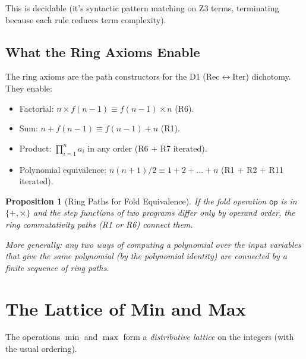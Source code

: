 \documentclass[11pt,a4paper]{report}
\theoremstyle{definition}
\theoremstyle{plain}
\newtheorem{proposition}[definition]{Proposition}
\newcommand{\op}{\mathsf{op}}
\begin{document}
This is decidable (it's syntactic pattern matching on Z3 terms,
terminating because each rule reduces term complexity).

\subsection{What the Ring Axioms Enable}

The ring axioms are the path constructors for the D1
(Rec$\leftrightarrow$Iter) dichotomy.  They enable:

\begin{itemize}
  \item Factorial: $n \times f(n-1) \equiv f(n-1) \times n$ (R6).
  \item Sum: $n + f(n-1) \equiv f(n-1) + n$ (R1).
  \item Product: $\prod_{i=1}^n a_i$ in any order (R6 + R7 iterated).
  \item Polynomial equivalence: $n(n+1)/2 \equiv 1 + 2 + \ldots + n$
    (R1 + R2 + R11 iterated).
\end{itemize}

\begin{proposition}[Ring Paths for Fold Equivalence]
If the fold operation $\op$ is in $\{+, \times\}$ and the step
functions of two programs differ only by operand order, the ring
commutativity paths (R1 or R6) connect them.

More generally: any two ways of computing a polynomial over the
input variables that give the same polynomial (by the polynomial
identity) are connected by a finite sequence of ring paths.
\end{proposition}


\section{The Lattice of Min and Max}

The operations $\min$ and $\max$ form a \emph{distributive lattice}
on the integers (with the usual ordering).
\end{document}
